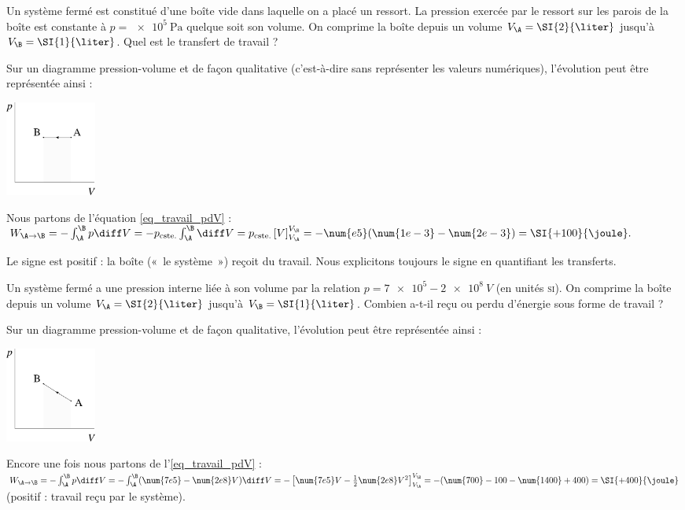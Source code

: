 		\begin{anexample}
			
			Un système fermé est constitué d’une boîte vide dans laquelle on a placé un ressort. La pression exercée par le ressort sur les parois de la boîte est constante à $p = \SI{e5}{\pascal}$ quelque soit son volume. On comprime la boîte depuis un volume $V_\A = \SI{2}{\liter}$ jusqu’à $V_\B = \SI{1}{\liter}$. Quel est le transfert de travail ?
				\begin{answer}
						Sur un diagramme pression-volume et de façon qualitative (c’est-à-dire sans représenter les valeurs numériques), l’évolution peut être représentée ainsi :
							\begin{center}
								\includegraphics[width=3cm]{images/exe_pv_isobare.png}
							\end{center}
					Nous partons de l’équation \ref{eq_travail_pdV} : $W_{\A\to\B} = - \int_\A^\B p \diff V = - p_\text{cste.} \int_\A^\B \diff V = p_\text{cste.} \left[V\right]_{V_\A}^{V_\B } = - \num{e5} (\num{1e-3} - \num{2e-3}) = \SI{+100}{\joule}.$
					\begin{remark}Le signe est positif : la boîte («~le système~») reçoit du travail. Nous explicitons toujours le signe en quantifiant les transferts.\end{remark}
				\end{answer}
		\end{anexample}


		\begin{anexample}
			Un système fermé a une pression interne liée à son volume par la relation $p = \num{7e5} - \num{2e8} \ V$ (en unités \textsc{si}). On comprime la boîte depuis un volume $V_\A = \SI{2}{\liter}$ jusqu’à $V_\B = \SI{1}{\liter}$. Combien a-t-il reçu ou perdu d’énergie sous forme de travail ?
				\begin{answer}
						Sur un diagramme pression-volume et de façon qualitative, l’évolution peut être représentée ainsi :
							\begin{center}
								\includegraphics[width=3cm]{images/exe_pv_prop.png}
							\end{center}
					Encore une fois nous partons de l’\cref{eq_travail_pdV} : $W_{\A\to\B} = - \int_\A^\B p \diff V = - \int_\A^\B (\num{7e5} - \num{2e8} V) \diff V = - \left[\num{7e5}V - \frac{1}{2}\num{2e8} V^2\right]_{V_\A}^{V_\B } = - (\num{700} - 100 - \num{1400} + 400) = \SI{+400}{\joule}$ (positif : travail reçu par le système).
				\end{answer}
		\end{anexample}
		

